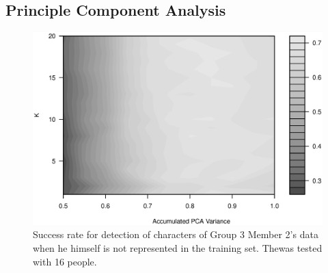 \subsection{Principle Component Analysis}


\begin{figure}[H]
\centering
\includegraphics[width = 16cm]{graphics/contour_k_PCA_oneVsRest}
\caption{Success rate for detection of characters of Group 3 Member 2's data when he himself is not represented in the training set. 
Thewas tested with 16 people.}
\label{fig:}
\end{figure}



